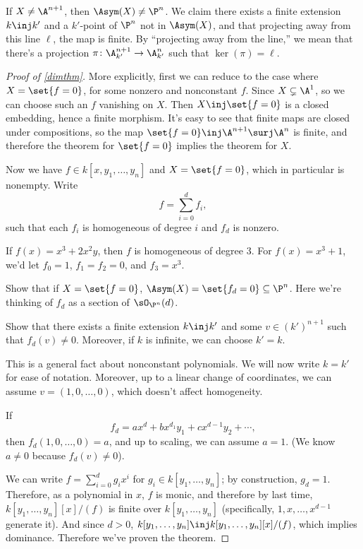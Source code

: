 If $X\ne \A^{n+1}$, then $\Asym(X)\ne\P^n$. We claim there exists a finite extension $k\inj k'$ and a $k'$-point of
$\P^n$ not in $\Asym(X)$, and that projecting away from this line $\ell$, the map is finite. By ``projecting away
from the line,'' we mean that there's a projection $\pi\colon \A^{n+1}_{k'}\to\A_{k'}^n$ such that $\ker(\pi) =
\ell$.
\begin{proof}[Proof of \cref{dimthm}]
More explicitly, first we can reduce to the case where $X = \set{f = 0}$, for some nonzero and nonconstant $f$.
Since $X\subsetneq\A^1$, so we can choose such an $f$ vanishing on $X$. Then $X\inj\set{f = 0}$ is a closed
embedding, hence a finite morphism. It's easy to see that finite maps are closed under compositions, so the map
$\set{f = 0}\inj\A^{n+1}\surj\A^n$ is finite, and therefore the theorem for $\set{f= 0}$ implies the theorem for
$X$.

Now we have $f\in k[x,y_1,\dotsc,y_n]$ and $X = \set{f = 0}$, which in particular is nonempty. Write
\begin{equation}
	f = \sum_{i=0}^d f_i,
\end{equation}
such that each $f_i$ is homogeneous of degree $i$ and $f_d$ is nonzero.
\begin{exm}
If $f(x) = x^3 + 2x^2y$, then $f$ is homogeneous of degree 3. For $f(x) = x^3+1$, we'd let $f_0 = 1$, $f_1 = f_2 =
0$, and $f_3 = x^3$.
\end{exm}
\begin{ex}
Show that if $X = \set{f = 0}$, $\Asym(X) = \set{f_d = 0}\subseteq\P^n$. Here we're thinking of $f_d$ as a section
of $\sO_{\P^n}(d)$.
\end{ex}
\begin{ex}
Show that there exists a finite extension $k\inj k'$ and some $v\in (k')^{n+1}$ such that $f_d(v)\ne 0$. Moreover,
if $k$ is infinite, we can choose $k' = k$.
\end{ex}
This is a general fact about nonconstant polynomials. We will now write $k = k'$ for ease of notation. Moreover, up
to a linear change of coordinates, we can assume $v = (1,0,\dotsc,0)$, which doesn't affect homogeneity.

If
\begin{equation}
	f_d = ax^d + bx^{d_1}y_1 + cx^{d-1}y_2 + \dotsb,
\end{equation}
then $f_d(1,0,\dotsc,0) = a$, and up to scaling, we can assume $a = 1$. (We know $a\ne 0$ because $f_d(v)\ne 0$).

We can write $f = \sum_{i=0}^d g_ix^i$ for $g_i\in k[y_1,\dotsc,y_n]$; by construction, $g_d = 1$. Therefore, as a
polynomial in $x$, $f$ is monic, and therefore by last time, $k[y_1,\dotsc,y_n][x]/(f)$ is finite over
$k[y_1,\dotsc,y_n]$ (specifically, $1,x,\dotsc,x^{d-1}$ generate it). And since $d > 0$, $k[y_1,\dotsc,y_n]\inj
k[y_1,\dotsc,y_n][x]/(f)$, which implies dominance. Therefore we've proven the theorem.
\end{proof}
